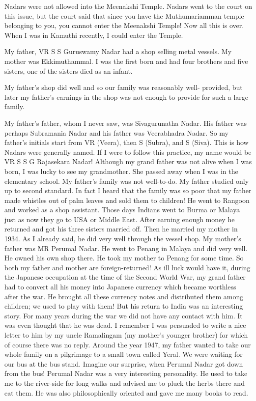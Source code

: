 Nadars were not allowed into the Meenakshi Temple. Nadars went to the 
court on this issue, but the court said that since you have the 
Muthumariamman temple belonging to you, you cannot enter the Meenakshi 
Temple! Now all this is over. When I was in Kamuthi recently, I could 
enter the Temple.

My father, VR S S Guruswamy Nadar had a shop selling metal vessels. My 
mother was Ekkimuthammal. I was the first born and had four brothers and 
five sisters, one of the sisters died as an infant.

My father's shop did well and so our family was reasonably well- 
provided, but later my father's earnings in the shop was not enough to 
provide for such a large family.

My father's father, whom I never saw, was Sivagurunatha Nadar. His 
father was perhaps Subramania Nadar and his father was Veerabhadra 
Nadar. So my father's initials start from VR (Veera), then S (Subra), 
and S (Siva). This is how Nadars were generally named. If I were to 
follow this practice, my name would be VR S S G Rajasekara Nadar! 
Although my grand father was not alive when I was born, I was lucky to 
see my grandmother. She passed away when I was in the elementary school.
\vskip 2pt
My father's family was not well-to-do. My father studied only up to 
second standard. In fact I heard that the family was so poor that my 
father made whistles out of palm leaves and sold them to children!
\vskip 2pt
He went to Rangoon and worked as a shop assistant. Those days Indians 
went to Burma or Malaya just as now they go to USA or Middle East. After 
earning enough money he returned and got his three sisters married off. 
Then he married my mother in 1934. As I already said, he did very well 
through the vessel shop.
\vskip 2pt
My mother's father was MR Perumal Nadar. He went to Pe\-nang in Malaya and 
did very well. He owned his own shop there. He took my mother to Penang 
for some time. So both my father and mother are foreign-returned!
\vskip 2pt
As ill luck would have it, during the Japanese occupation at the time of 
the Second World War, my grand father had to convert all his money into 
Japanese currency which became worthless after the war. He brought all 
these currency notes and distributed them among children; we used to 
play with them!
\vskip 2pt
But his return to India was an interesting story. For many years during 
the war we did not have any contact with him. It was even thought that 
he was dead. I remember I was persuaded to write a nice letter to him by 
my uncle Ramalingam (my mo\-ther's younger brother) for which of course 
there was no reply.
\vskip 3pt
Around the year 1947, my father wanted to take our whole family on a 
pilgrimage to a small town called Yeral. We were waiting for our bus at 
the bus stand. Imagine our surprise, when Perumal Nadar got down from 
the bus!
\vskip 3pt
Perumal Nadar was a very interesting personality. He used to take me to 
the river-side for long walks and advised me to pluck the herbs there 
and eat them. He was also philosophically oriented and gave me many 
books to read.

